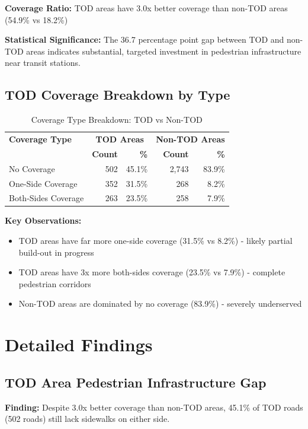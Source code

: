 \documentclass[11pt,letterpaper]{article}
\begin{document}
\textbf{Coverage Ratio:} TOD areas have 3.0x better coverage than non-TOD areas (54.9\% vs 18.2\%)

\textbf{Statistical Significance:} The 36.7 percentage point gap between TOD and non-TOD areas indicates substantial, targeted investment in pedestrian infrastructure near transit stations.

\subsection{TOD Coverage Breakdown by Type}

\begin{table}[H]
\centering
\begin{tabular}{@{}lrrrr@{}}
\toprule
\textbf{Coverage Type} & \multicolumn{2}{c}{\textbf{TOD Areas}} & \multicolumn{2}{c}{\textbf{Non-TOD Areas}} \\
 & \textbf{Count} & \textbf{\%} & \textbf{Count} & \textbf{\%} \\
\midrule
No Coverage & 502 & 45.1\% & 2,743 & 83.9\% \\
One-Side Coverage & 352 & 31.5\% & 268 & 8.2\% \\
Both-Sides Coverage & 263 & 23.5\% & 258 & 7.9\% \\
\bottomrule
\end{tabular}
\caption{Coverage Type Breakdown: TOD vs Non-TOD}
\end{table}

\textbf{Key Observations:}
\begin{itemize}
    \item TOD areas have far more one-side coverage (31.5\% vs 8.2\%) - likely partial build-out in progress
    \item TOD areas have 3x more both-sides coverage (23.5\% vs 7.9\%) - complete pedestrian corridors
    \item Non-TOD areas are dominated by no coverage (83.9\%) - severely underserved
\end{itemize}

\section{Detailed Findings}

\subsection{TOD Area Pedestrian Infrastructure Gap}

\textbf{Finding:} Despite 3.0x better coverage than non-TOD areas, 45.1\% of TOD roads (502 roads) still lack sidewalks on either side.
\end{document}
